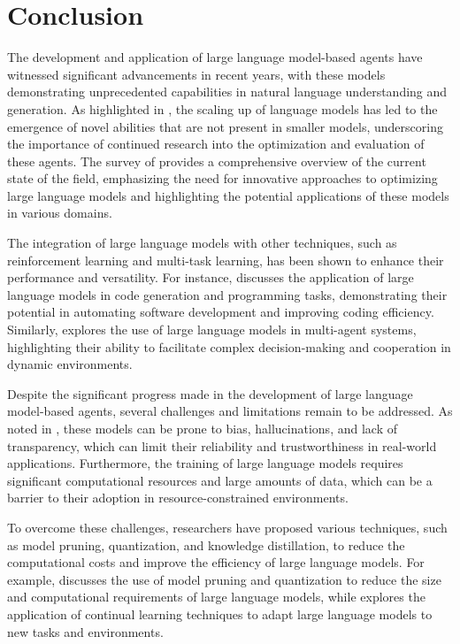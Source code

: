 \documentclass[11pt,a4paper]{article}
\begin{document}
\section{Conclusion}


The development and application of large language model-based agents have witnessed significant advancements in recent years, with these models demonstrating unprecedented capabilities in natural language understanding and generation. As highlighted in \cite{arxiv:2206.07682}, the scaling up of language models has led to the emergence of novel abilities that are not present in smaller models, underscoring the importance of continued research into the optimization and evaluation of these agents. The survey of \cite{arxiv:2309.14365} provides a comprehensive overview of the current state of the field, emphasizing the need for innovative approaches to optimizing large language models and highlighting the potential applications of these models in various domains.

The integration of large language models with other techniques, such as reinforcement learning and multi-task learning, has been shown to enhance their performance and versatility. For instance, \cite{doi:10.18653/v1/2023.acl-long.411} discusses the application of large language models in code generation and programming tasks, demonstrating their potential in automating software development and improving coding efficiency. Similarly, \cite{arxiv:2402.01680} explores the use of large language models in multi-agent systems, highlighting their ability to facilitate complex decision-making and cooperation in dynamic environments.

Despite the significant progress made in the development of large language model-based agents, several challenges and limitations remain to be addressed. As noted in \cite{doi:10.1007/s10849-023-09409-x}, these models can be prone to bias, hallucinations, and lack of transparency, which can limit their reliability and trustworthiness in real-world applications. Furthermore, the training of large language models requires significant computational resources and large amounts of data, which can be a barrier to their adoption in resource-constrained environments.

To overcome these challenges, researchers have proposed various techniques, such as model pruning, quantization, and knowledge distillation, to reduce the computational costs and improve the efficiency of large language models. For example, \cite{arxiv:2305.16264} discusses the use of model pruning and quantization to reduce the size and computational requirements of large language models, while \cite{arxiv:2402.01364} explores the application of continual learning techniques to adapt large language models to new tasks and environments.
\end{document}
